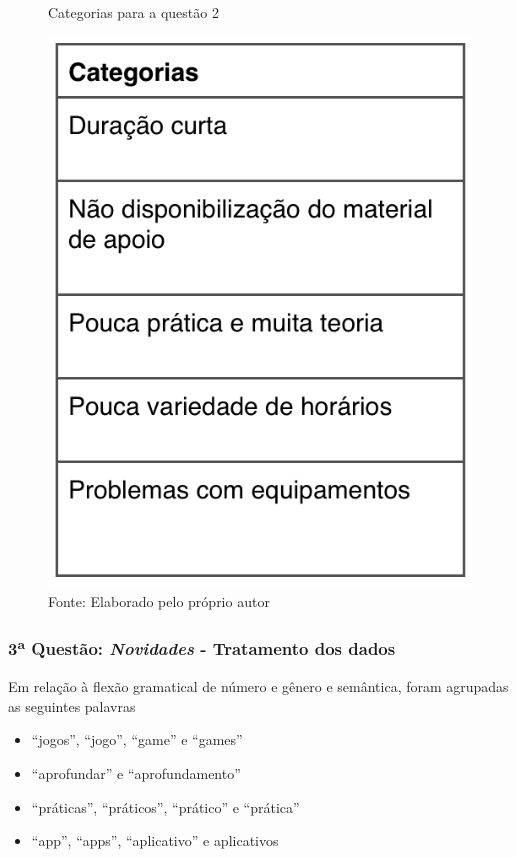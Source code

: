 \begin{figure}[H]
\caption{Categorias para a questão 2}
\centerline{\includegraphics[scale=0.75]{img/categoriasmelhorias}}
\label{fig:categoriasmelhorias}
\caption* {Fonte: Elaborado pelo próprio autor}
\end{figure}

\subsubsection*{3\textsuperscript{a} Questão: \textit{Novidades} - Tratamento dos dados }

Em relação à flexão gramatical de número e gênero e semântica, foram agrupadas as seguintes palavras

\begin{itemize}
\item \enquote{jogos}, \enquote{jogo}, \enquote{game} e \enquote{games}
\item \enquote{aprofundar} e \enquote{aprofundamento}
\item \enquote{práticas}, \enquote{práticos}, \enquote{prático} e \enquote{prática}
\item \enquote{app}, \enquote{apps}, \enquote{aplicativo} e {aplicativos}
\end{itemize}

